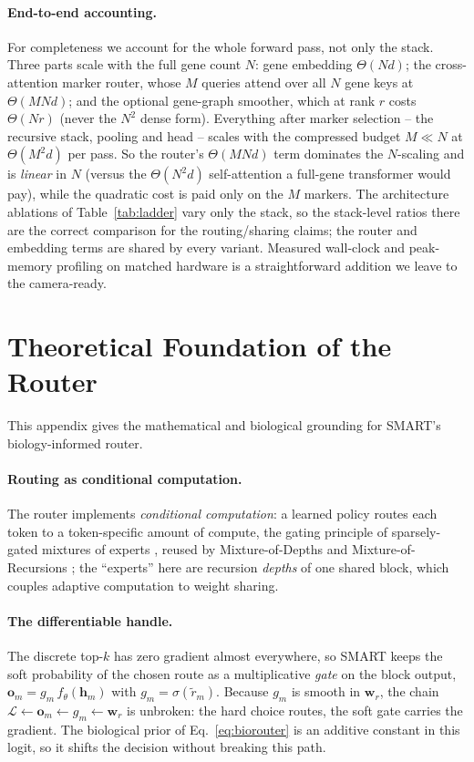 \documentclass[letterpaper]{article}
\begin{document}
\paragraph{End-to-end accounting.}
For completeness we account for the whole forward pass, not only the stack. Three parts
scale with the full gene count $N$: gene embedding $\Theta(Nd)$; the cross-attention
marker router, whose $M$ queries attend over all $N$ gene keys at
$\Theta(MNd)$; and the optional gene-graph smoother, which at rank $r$ costs
$\Theta(Nr)$ (never the $N^2$ dense form). Everything after marker selection -- the
recursive stack, pooling and head -- scales with the compressed budget $M\ll N$ at
$\Theta(M^2d)$ per pass. So the router's $\Theta(MNd)$ term dominates the $N$-scaling
and is \emph{linear} in $N$ (versus the $\Theta(N^2 d)$ self-attention a full-gene
transformer would pay), while the quadratic cost is paid only on the $M$ markers. The
architecture ablations of Table~\ref{tab:ladder} vary only the stack, so the stack-level
ratios there are the correct comparison for the routing/sharing claims; the router and
embedding terms are shared by every variant. Measured wall-clock and peak-memory
profiling on matched hardware is a straightforward addition we leave to the camera-ready.

\section{Theoretical Foundation of the Router}
\label{app:theory}
This appendix gives the mathematical and biological grounding for SMART's
biology-informed router.

\paragraph{Routing as conditional computation.}
The router implements \emph{conditional computation}: a learned policy routes each token
to a token-specific amount of compute, the gating principle of sparsely-gated mixtures
of experts \cite{shazeer2017outrageously}, reused by Mixture-of-Depths
\cite{raposo2024mixture} and Mixture-of-Recursions \cite{bae2025mixture}; the
``experts'' here are recursion \emph{depths} of one shared block, which couples adaptive
computation \cite{graves2016adaptive} to weight sharing.

\paragraph{The differentiable handle.}
The discrete top-$k$ has zero gradient almost everywhere, so SMART keeps the soft
probability of the chosen route as a multiplicative \emph{gate} on the block output,
$\mathbf{o}_m=g_m\,f_\theta(\mathbf{h}_m)$ with $g_m=\sigma(\tilde r_m)$. Because $g_m$
is smooth in $\mathbf{w}_r$, the chain
$\mathcal{L}\!\leftarrow\!\mathbf{o}_m\!\leftarrow\!g_m\!\leftarrow\!\mathbf{w}_r$ is
unbroken: the hard choice routes, the soft gate carries the gradient. The biological
prior of Eq.~\eqref{eq:biorouter} is an additive constant in this logit, so it shifts
the decision without breaking this path.
\end{document}
